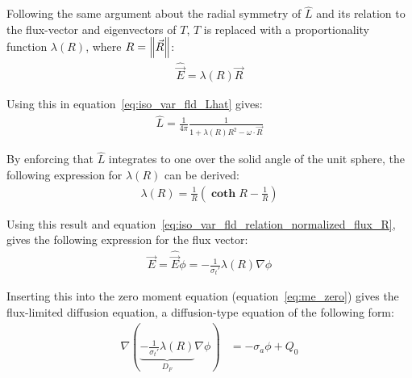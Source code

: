 Following the same argument about the radial symmetry of $\hat{L}$ and its relation to the flux-vector and eigenvectors of $T$, $T$ is replaced with a proportionality function $\lambda(R)$, where $R=\left\lVert\vec{R}\right\rVert$:
\begin{align}
\widehat{\vec{E}} = \lambda(R)\vec{R}
\label{eq:iso_var_fld_relation_normalized_flux_R}
\end{align}

Using this in equation~\ref{eq:iso_var_fld_Lhat} gives:
\begin{align}
\label{eq:iso_var_fld_Lhat_R}
\hat{L} = \frac{1}{4\pi}\frac{1}{1+\lambda(R)R^2-\omega\cdot\vec{R}}
\end{align}

By enforcing that $\hat{L}$ integrates to one over the solid angle of the unit sphere, the following expression for $\lambda(R)$ can be derived:
\begin{align}
\label{eq:iso_var_fld_lambdaR}
\lambda(R) = \frac{1}{R}\left(\mathbf{\operatorname{coth}}R - \frac{1}{R}\right)
\end{align}

Using this result and equation~\ref{eq:iso_var_fld_relation_normalized_flux_R}, gives the following expression for the flux vector:
\begin{align}
\label{eq:iso_var_fld_fluxvector}
\vec{E} = \widehat{\vec{E}}\phi=-\frac{1}{\sigma_t'}\lambda(R)\nabla\phi
\end{align}

Inserting this into the zero moment equation (equation~\ref{eq:me_zero}) gives the flux-limited diffusion equation, a diffusion-type equation of the following form:
\begin{align}
\label{eq:iso_var_fld_final}
\nabla\left( \underbrace{-\frac{1}{\sigma_t'}\lambda(R)}_{D_F}\nabla\phi\right) &= -\sigma_a\phi + Q_0
\end{align}

